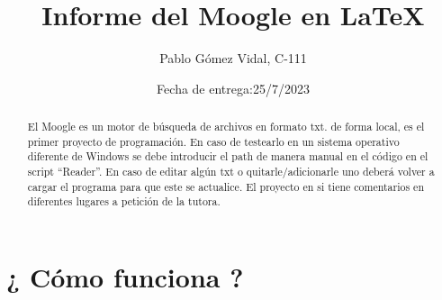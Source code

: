\documentclass[a4paper,12pt]{article}
\begin{document}
\title{Informe del Moogle en \LaTeX}
\author{Pablo Gómez Vidal, C-111}
\date{Fecha de entrega:25/7/2023}
\maketitle

\begin{abstract}
   El Moogle es un motor de búsqueda de archivos en formato txt. de forma local, es el primer proyecto de programación.
En caso de testearlo en un sistema operativo diferente de Windows se debe introducir el path de manera manual en el código en el script “Reader”. 
En caso de editar algún txt o quitarle/adicionarle uno deberá volver a cargar el programa para que este se actualice. El proyecto en si tiene comentarios en diferentes lugares a petición de la tutora. 
\end{abstract}

\section{¿ Cómo funciona ?}\label{sec:intro}
\end{document}

